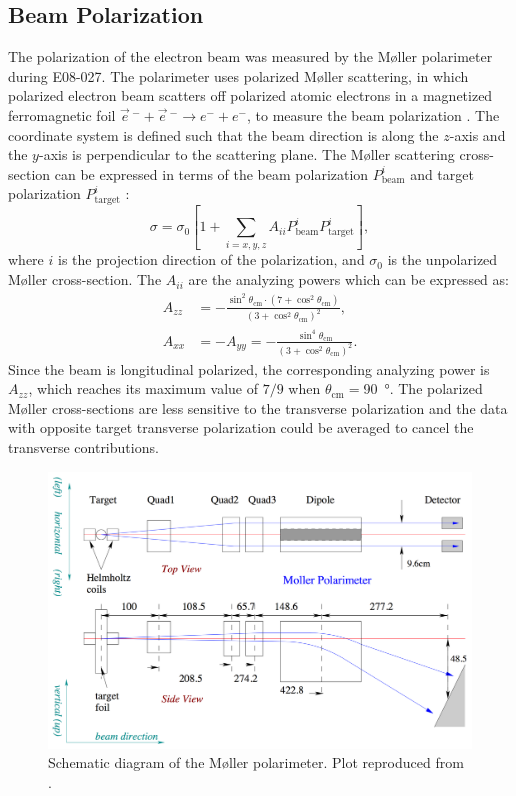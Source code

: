 \subsection{Beam Polarization}
\label{C5S2SS4}

The polarization of the electron beam was measured by the M{\o}ller polarimeter during E08-027. The polarimeter uses polarized M{\o}ller scattering, in which polarized electron beam scatters off polarized atomic electrons in a magnetized ferromagnetic foil $\vec{e}\,^-+\vec{e}\,^-\rightarrow e^-+e^-$, to measure the beam polarization \cite{MOLLER,Alcorn2004}. The coordinate system is defined such that the beam direction is along the $z$-axis and the $y$-axis is perpendicular to the scattering plane. The M{\o}ller scattering cross-section can be expressed in terms of the beam polarization $P_{\mathrm{beam}}^i$ and target polarization $P_{\mathrm{target}}^i$ \cite{Alcorn2004}:
\begin{equation} \label{C5S2SS4E1}
\sigma = \sigma_0\left[1+\sum_{i=x,y,z}A_{ii}P_{\mathrm{beam}}^iP_{\mathrm{target}}^i\right],
\end{equation}
where $i$ is the projection direction of the polarization, and $\sigma_0$ is the unpolarized M{\o}ller cross-section. The $A_{ii}$ are the analyzing powers which can be expressed as:
\begin{align} \label{C5S2SS4E2}
A_{zz} & = -\frac{\sin^2\theta_{\mathrm{cm}}\cdot(7+\cos^2\theta_{\mathrm{cm}})}{(3+\cos^2\theta_{\mathrm{cm}})^2}, \\ \label{C5S2SS4E3}
A_{xx} & = -A_{yy} =  -\frac{\sin^4\theta_{\mathrm{cm}}}{(3+\cos^2\theta_{\mathrm{cm}})^2}.
\end{align}
Since the beam is longitudinal polarized, the corresponding analyzing power is $A_{zz}$, which reaches its maximum value of $7/9$ when $\theta_{\mathrm{cm}}=$\SI{90}{\degree}. The polarized M{\o}ller cross-sections are less sensitive to the transverse polarization and the data with opposite target transverse polarization could be averaged to cancel the transverse contributions.

\begin{figure}[b!]
  \centering
  \includegraphics[width=\textwidth]{figs/moller.png}
  \caption[Schematic diagram of the M{\o}ller polarimeter.]{Schematic diagram of the M{\o}ller polarimeter. Plot reproduced from \cite{Zheng2002}. \label{C5S2SS4F1}}
\end{figure}

